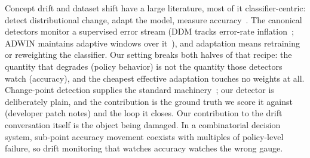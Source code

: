 \documentclass[journal]{IEEEtran}
\begin{document}
Concept drift and dataset shift have a large literature, most of it
classifier-centric: detect distributional change, adapt the model,
measure accuracy~\cite{quinonero2009dataset,gama2014survey,lu2018learning}.
The canonical detectors monitor a supervised error stream (DDM tracks
error-rate inflation~\cite{gama2004ddm}; ADWIN maintains adaptive
windows over it~\cite{bifet2007adwin}), and adaptation means retraining
or reweighting the classifier. Our setting breaks both halves of that
recipe: the quantity that degrades (policy behavior) is not the quantity
those detectors watch (accuracy), and the cheapest effective adaptation
touches no weights at all. Change-point detection supplies the standard
machinery~\cite{aminikhanghahi2017survey}; our detector is deliberately
plain, and the contribution is the ground truth we score it against
(developer patch notes) and the loop it closes. Our contribution to the
drift conversation itself is the object being damaged. In a
combinatorial decision system, sub-point accuracy movement coexists with
multiples of policy-level failure, so drift monitoring that watches
accuracy watches the wrong gauge.
\end{document}
